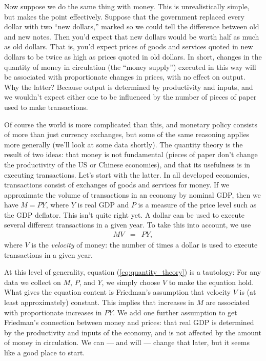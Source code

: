 Now suppose we do the same thing with money.  This is
unrealistically simple, but makes the point effectively. Suppose that the
government replaced every dollar with two ``new dollars,''
marked so we could tell the difference between old and new notes. Then
you'd expect that new dollars would be worth half as much
as old dollars. That is, you'd expect prices of goods and services
quoted in new dollars to be twice as high as prices quoted in old
dollars. In short, changes in the quantity of money in circulation
(the ``money supply'') executed in this way will be associated with
proportionate changes in prices, with no effect on output.  Why the
latter? Because output is determined by productivity and inputs, and
we wouldn't expect either one to be influenced by the number of
pieces of paper used to make transactions.

Of course the world is more complicated than this, and monetary policy 
 consists of more than just currency exchanges, but some of
the same reasoning applies more generally (we'll look at some data
shortly). The quantity theory is the result of two ideas:  that
money is not fundamental (pieces of paper don't change the
productivity of the US or Chinese economies), and that its
usefulness is in executing transactions.  Let's start with the
latter. In all developed economies, transactions consist of
exchanges of goods and services for money. If we approximate the volume of
transactions in an economy by nominal GDP, then we have
$M=PY$, where $Y$ is real GDP and $P$ is a measure of the
price level such as the GDP deflator.  This isn't quite right yet. A
dollar can be used to execute several different transactions in a
given year.
To take this into account, we use
%
\begin{eqnarray}
    M V  &=&  P Y,
    \label{eq:quantity_theory}
\end{eqnarray}
%
where $V$ is the \textit{velocity} of money: the number of times a
dollar is used to execute transactions in a given year.

At this level of generality,
equation (\ref{eq:quantity_theory}) is a tautology:
For any data we collect on $M$, $P$, and $Y$,
we simply choose $V$ to make the equation hold.
What gives the equation content is Friedman's
assumption that velocity 
 $V$ is (at least approximately)
constant.  This implies that increases in $M$ are associated with
proportionate increases in $PY$.
We add one further assumption to get Friedman's connection between
money and prices:
that real GDP is determined by the productivity and inputs of the economy,
and is not affected by the amount of money in circulation.
We can --- and will --- change that later, but it seems like a good place to start.


